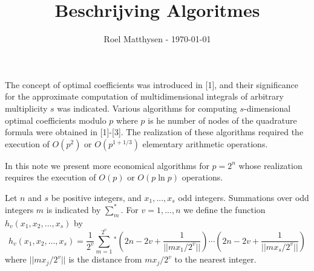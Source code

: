 \documentclass[a4paper, 12pt]{article}
\title{Beschrijving Algoritmes}
\author{Roel Matthysen - \today}
\date{}
\begin{document}
\newcommand{\comm}[1]{\textcolor{RubineRed}{\newline#1\newline}}

\maketitle
The concept of optimal coefficients was introduced in [1], and their significance for the approximate computation of multidimensional integrals of arbitrary multiplicity $s$ was indicated. Various algorithms for computing $s$-dimensional optimal coefficients modulo $p$ where $p$ is he number of nodes of the quadrature formula were obtained in [1]-[3]. The realization of these algorithms required the execution of $O(p^2)$ or $O(p^{1+1/3})$ elementary arithmetic operations.

In this note we present more economical algorithms for $p=2^n$ whose realization requires the execution of $O(p)$ or $O(p\ln{p})$ operations.

Let $n$ and $s$ be positive integers, and $x_1,...,x_s$ odd integers. Summations over odd integers $m$ is indicated by $\sum_m^*$. For $v=1,...,n$ we define the function $h_v(x_1,x_2,...,x_s)$ by
 \begin{equation*}
h_v(x_1,x_2,...,x_s)=\frac{1}{2^v}\sum_{m=1}^{2^v}{}^*\left(2n-2v+\frac{1}{||mx_1/2^v||}\right)\cdots\left(2n-2v+\frac{1}{||mx_s/2^v||}\right)
\end{equation*}
where $||mx_j/2^v||$ is the distance from $mx_j/2^v$ to the nearest integer. 
\end{document}
